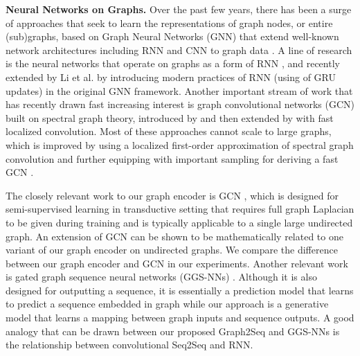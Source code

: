 \documentclass{article} \usepackage{iclr2019_conference,times}
\begin{document}
\textbf{Neural Networks on Graphs.} Over the past few years, there has been a surge of approaches that seek to learn the representations of graph nodes, or entire (sub)graphs, based on Graph Neural Networks (GNN) that extend well-known network architectures including RNN and CNN to graph data \citep{gori2005new,scarselli2009graph,li2015gated,bruna2013spectral,duvenaud2015convolutional,niepert2016learning,defferrard2016convolutional,yang2016revisiting,kipf2016semi,chen2018fastgcn}. A line of research is the neural networks that operate on graphs as a form of RNN \citep{gori2005new,scarselli2009graph}, and recently extended by Li et al. \citep{li2015gated} by introducing modern practices of RNN (using of GRU updates) in the original GNN framework. Another important stream of work that has recently drawn fast increasing interest is graph convolutional networks (GCN) built on spectral graph theory, introduced by \cite{bruna2013spectral} and then extended by \cite{defferrard2016convolutional} with fast localized convolution. Most of these approaches cannot scale to large graphs, which is improved by using a localized first-order approximation of spectral graph convolution \citep{kipf2016semi} and further equipping with important sampling for deriving a fast GCN \citep{chen2018fastgcn}.  

The closely relevant work to our graph encoder is GCN \citep{kipf2016semi}, which is designed for semi-supervised learning in transductive setting that requires full graph Laplacian to be given during training and is typically applicable to a single large undirected graph. An extension of GCN can be shown to be mathematically related to one variant of our graph encoder on undirected graphs. We compare the difference between our graph encoder and GCN in our experiments. Another relevant work is gated graph sequence neural networks (GGS-NNs) \citep{li2015gated}. Although it is also designed for outputting a sequence, it is essentially a prediction model that learns to predict a sequence embedded in graph while our approach is a generative model that learns a mapping between graph inputs and sequence outputs. A good analogy that can be drawn between our proposed Graph2Seq and GGS-NNs is the relationship between convolutional Seq2Seq and RNN. 
\end{document}
